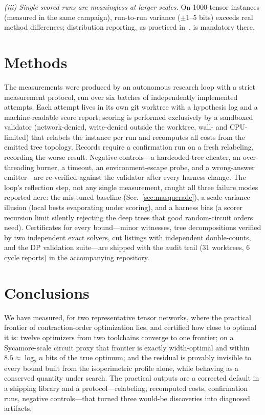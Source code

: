 \documentclass[a4paper,11pt,noarxiv]{quantumarticle}
\begin{document}
\emph{(iii) Single scored runs are meaningless at larger scales.} On
1000-tensor instances (measured in the same campaign), run-to-run variance
($\pm 1$--$5$ bits) exceeds real method differences; distribution reporting,
as practiced in~\cite{gray_2020_hyper}, is mandatory there.

\section{Methods}
\label{sec:methods}

The measurements were produced by an autonomous research loop with a strict
measurement protocol, run over six batches of independently implemented
attempts. Each attempt lives in its own git worktree with a hypothesis log
and a machine-readable score report; scoring is performed exclusively by a
sandboxed validator (network-denied, write-denied outside the worktree,
wall- and CPU-limited) that relabels the instance per run and recomputes all
costs from the emitted tree topology. Records require a confirmation run on
a fresh relabeling, recording the worse result. Negative controls---a
hardcoded-tree cheater, an over-threading burner, a timeout, an
environment-escape probe, and a wrong-answer emitter---are re-verified
against the validator after every harness change. The loop's reflection
step, not any single measurement, caught all three failure modes reported
here: the mis-tuned baseline (Sec.~\ref{sec:masquerade}), a scale-variance
illusion (local bests evaporating under scoring), and a harness bias (a
scorer recursion limit silently rejecting the deep trees that good
random-circuit orders need). Certificates for every bound---minor witnesses,
tree decompositions verified by two independent exact solvers, cut listings
with independent double-counts, and the DP validation suite---are shipped
with the audit trail (31 worktrees, 6 cycle reports) in the accompanying
repository.

\section{Conclusions}
\label{sec:conclusions}

We have measured, for two representative tensor networks, where the practical
frontier of contraction-order optimization lies, and certified how close to
optimal it is: twelve optimizers from two toolchains converge to one frontier;
on a Sycamore-scale circuit proxy that frontier is exactly width-optimal and
within $8.5 \approx \log_2 n$ bits of the true optimum; and the residual is
provably invisible to every bound built from the isoperimetric profile alone,
while behaving as a conserved quantity under search. The practical outputs
are a corrected default in a shipping library and a protocol---relabeling,
recomputed costs, confirmation runs, negative controls---that turned three
would-be discoveries into diagnosed artifacts.
\end{document}
